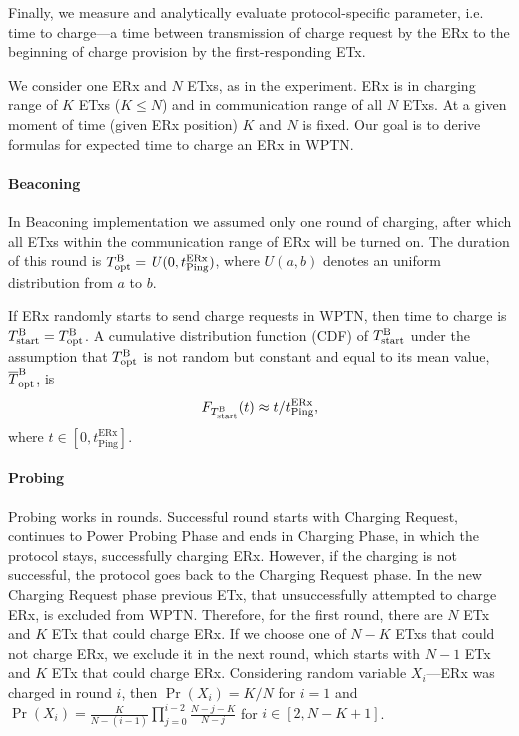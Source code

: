 \documentclass[11pt,draftclsnofoot,journal,onecolumn]{IEEEtran}
\begin{document}
Finally, we measure and analytically evaluate protocol-specific parameter, i.e. time to charge---a time between transmission of charge request by the ERx to the beginning of charge provision by the first-responding ETx. 

We consider one ERx and $N$ ETxs, as in the experiment. ERx is in charging range of $K$ ETxs ($K \leq N$) and in communication range of all $N$ ETxs. At a given moment of time (given ERx position) $K$ and $N$ is fixed. Our goal is to derive formulas for expected time to charge an ERx in WPTN.

\paragraph{Beaconing}

In Beaconing implementation we assumed only one round of charging, after which all ETxs within the communication range of ERx will be turned on. The duration of this round is $T^{\text{B}}_{\text{opt}} = \mathit{U}(0, t^\text{ERx}_\text{Ping})$, where $\mathit{U}(a, b)$ denotes an uniform distribution from $a$ to $b$.

If ERx randomly starts to send charge requests in WPTN, then time to charge is $T^{\text{B}}_{\text{start}} = T^{\text{B}}_{\text{opt}}$. A cumulative distribution function (CDF) of $T^{\text{B}}_{\text{start}}$ under the assumption that $T^{\text{B}}_{\text{opt}}$ is not random but constant and equal to its mean value, $\overline{T}^{\text{B}}_{\text{opt}}$, is
\begin{equation}
F_{T^{\text{B}}_{\text{start}}}(t) \approx t/t^\text{ERx}_\text{Ping},
\end{equation}
where $t\in[0,t^\text{ERx}_\text{Ping}]$.

\paragraph{Probing}

Probing works in rounds. Successful round starts with Charging Request, continues to Power Probing Phase and ends in Charging Phase, in which the protocol stays, successfully charging ERx. However, if the charging is not successful, the protocol goes back to the Charging Request phase. In the new Charging Request phase previous ETx, that unsuccessfully attempted to charge ERx, is excluded from WPTN. Therefore, for the first round, there are $N$ ETx and $K$ ETx that could charge ERx. If we choose one of $N-K$ ETxs that could not charge ERx, we exclude it in the next round, which starts with $N-1$ ETx and $K$ ETx that could charge ERx. Considering random variable $X_i$---ERx was charged in round $i$, then $\Pr(X_i)=K/N$ for $i=1$ and $\Pr(X_i) = \frac{K}{N-(i-1)} \prod_{j = 0}^{i-2}\frac{N-j-K}{N-j}$ for $i\in[2,N-K+1]$.
\end{document}
